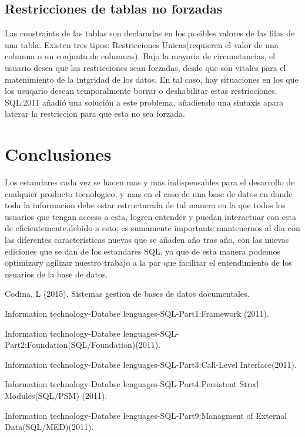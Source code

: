 \documentclass[twoside,twocolumn]{article}
\begin{document}
\subsection{Restricciones de tablas no forzadas}
Las constraints de las tablas son declaradas en los posibles valores de las filas de una tabla. Existen tres tipos: Restricciones Unicas(requieren el valor de una columna o un conjunto de columnas).
Bajo la mayoria de circunstancias, el usuario desea que las restricciones sean forzadas, desde que son vitales para el matenimiento de la intgridad de los datos. En tal caso, hay situaciones en los que los usuqario desean temporalmente borrar o deshabilitar estas restricciones. SQL:2011 añadió una solución a este problema, añadiendo una sintaxis apara laterar la restriccion para que esta no sea forzada.


\section{Conclusiones}
Los estandares cada vez se hacen mas y mas indispensables para el desarrollo de cualquier producto tecnologico, y mas en el caso de una base de datos en donde toda la informacion debe estar estructurada de tal manera en la que todos los usuarios que tengan acceso a esta, logren entender y puedan interactuar con esta de eficientemente,debido a esto, es sumamente importante mantenernos al dia con las diferentes caracteristicas nuevas que se añaden año tras año, con las nuevas ediciones que se dan de los estandares SQL, ya que de esta manera podemos optimizary agilizar nuestro trabajo a la par que facilitar el entendimiento de los usuarios de la base de datos.

\begin{thebibliography}{99} %
Codina, L (2015).
\newblock Sistemas gestion de bases de datos documentales.


Information technology-Databse lenguages-SQL-Part1:Framework (2011).

Information technology-Databse lenguages-SQL-Part2:Foundation(SQL/Foundation)(2011).

Information technology-Databse lenguages-SQL-Part3:Call-Level Interface(2011).

Information technology-Databse lenguages-SQL-Part4:Persistent Stred Modules(SQL/PSM) (2011).

Information technology-Databse lenguages-SQL-Part9:Managment of External Data(SQL/MED)(2011).

 
 
\end{thebibliography}

\end{document}
